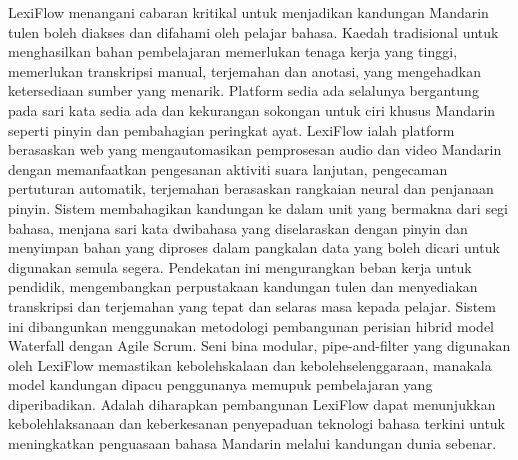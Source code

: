 \documentclass[oneside]{utmthesis}
\begin{document}
\begin{abstrak}
    LexiFlow menangani cabaran kritikal untuk menjadikan kandungan Mandarin tulen boleh diakses dan difahami oleh pelajar bahasa. Kaedah tradisional untuk menghasilkan bahan pembelajaran memerlukan tenaga kerja yang tinggi, memerlukan transkripsi manual, terjemahan dan anotasi, yang mengehadkan ketersediaan sumber yang menarik. Platform sedia ada selalunya bergantung pada sari kata sedia ada dan kekurangan sokongan untuk ciri khusus Mandarin seperti pinyin dan pembahagian peringkat ayat. LexiFlow ialah platform berasaskan web yang mengautomasikan pemprosesan audio dan video Mandarin dengan memanfaatkan pengesanan aktiviti suara lanjutan, pengecaman pertuturan automatik, terjemahan berasaskan rangkaian neural dan penjanaan pinyin. Sistem membahagikan kandungan ke dalam unit yang bermakna dari segi bahasa, menjana sari kata dwibahasa yang diselaraskan dengan pinyin dan menyimpan bahan yang diproses dalam pangkalan data yang boleh dicari untuk digunakan semula segera. Pendekatan ini mengurangkan beban kerja untuk pendidik, mengembangkan perpustakaan kandungan tulen dan menyediakan transkripsi dan terjemahan yang tepat dan selaras masa kepada pelajar. Sistem ini dibangunkan menggunakan metodologi pembangunan perisian hibrid model Waterfall dengan Agile Scrum. Seni bina modular, pipe-and-filter yang digunakan oleh LexiFlow memastikan kebolehskalaan dan kebolehselenggaraan, manakala model kandungan dipacu penggunanya memupuk pembelajaran yang diperibadikan. Adalah diharapkan pembangunan LexiFlow dapat menunjukkan kebolehlaksanaan dan keberkesanan penyepaduan teknologi bahasa terkini untuk meningkatkan penguasaan bahasa Mandarin melalui kandungan dunia sebenar.
\end{abstrak}

\tableofcontents
\listoftables
\listoffigures
\listofabbre
{}


\listofappendices
\end{document}
